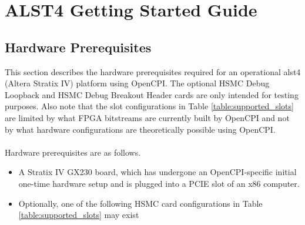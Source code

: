 \documentclass{article}
\begin{document}
\section*{ALST4 Getting Started Guide}
\subsection*{Hardware Prerequisites}
This section describes the hardware prerequisites required for an operational alst4 (Altera Stratix IV) platform using OpenCPI. The optional HSMC Debug Loopback and HSMC Debug Breakout Header cards are only intended for testing purposes. Also note that the slot configurations in Table \ref{table:supported_slots} are limited by what FPGA bitstreams are currently built by OpenCPI and not by what hardware configurations are theoretically possible using OpenCPI.\\ \\
Hardware prerequisites are as follows.
\begin{itemize}
\item A Stratix IV GX230 board, which has undergone an OpenCPI-specific initial one-time hardware setup \cite{alst4_hardware_setup} and is plugged into a PCIE slot of an x86 computer.
\item Optionally, one of the following HSMC card configurations in Table  \ref{table:supported_slots} may exist
\end{itemize}
\end{document}
